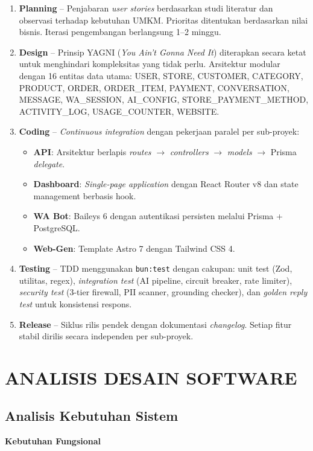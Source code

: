 \documentclass[12pt,a4paper,oneside]{article}
\newcommand{\bab}[1]{%
    \newpage
    \section{#1}%
}
\newcommand{\sub}[1]{%
    \subsection{#1}%
}
\begin{document}
\begin{enumerate}
	\item \textbf{Planning} -- Penjabaran \textit{user stories} berdasarkan studi literatur dan observasi terhadap kebutuhan UMKM. Prioritas ditentukan berdasarkan nilai bisnis. Iterasi pengembangan berlangsung 1--2 minggu.
	\item \textbf{Design} -- Prinsip YAGNI (\textit{You Ain't Gonna Need It}) diterapkan secara ketat untuk menghindari kompleksitas yang tidak perlu. Arsitektur modular dengan 16 entitas data utama: USER, STORE, CUSTOMER, CATEGORY, PRODUCT, ORDER, ORDER\_ITEM, PAYMENT, CONVERSATION, MESSAGE, WA\_SESSION, AI\_CONFIG, STORE\_PAYMENT\_METHOD, ACTIVITY\_LOG, USAGE\_COUNTER, WEBSITE.
	\item \textbf{Coding} -- \textit{Continuous integration} dengan pekerjaan paralel per sub-proyek:
	      \begin{itemize}
		      \item \textbf{API}: Arsitektur berlapis \textit{routes} $\rightarrow$ \textit{controllers} $\rightarrow$ \textit{models} $\rightarrow$ Prisma \textit{delegate}.
		      \item \textbf{Dashboard}: \textit{Single-page application} dengan React Router v8 dan state management berbasis hook.
		      \item \textbf{WA Bot}: Baileys 6 dengan autentikasi persisten melalui Prisma + PostgreSQL.
		      \item \textbf{Web-Gen}: Template Astro 7 dengan Tailwind CSS 4.
	      \end{itemize}
	\item \textbf{Testing} -- TDD menggunakan \texttt{bun:test} dengan cakupan: unit test (Zod, utilitas, regex), \textit{integration test} (AI pipeline, circuit breaker, rate limiter), \textit{security test} (3-tier firewall, PII scanner, grounding checker), dan \textit{golden reply test} untuk konsistensi respons.
	\item \textbf{Release} -- Siklus rilis pendek dengan dokumentasi \textit{changelog}. Setiap fitur stabil dirilis secara independen per sub-proyek.
\end{enumerate}

\bab{ANALISIS DESAIN SOFTWARE}

\sub{Analisis Kebutuhan Sistem}

\textbf{Kebutuhan Fungsional}
\end{document}
